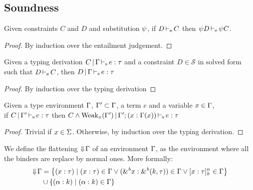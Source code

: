 \newcommand\mcase[1]{\noindent\textbf{Case }#1\\\noindent}

\subsection{Soundness}

\begin{lemma}
  \label{lemma:constrsubst}
  Given constraints $C$ and $D$ and substitution $\mathrm{\psi}$, if $D \operatorname{\vdash_e} C$
  then $\mathrm{\psi} D \operatorname{\vdash_e} \mathrm{\psi} C$.
  \begin{proof}
    By induction over the entailment judgement.
  \end{proof}
\end{lemma}

\begin{lemma}
  \label{lemma:constrimply}
  Given a typing derivation $C \operatorname{|} \Gamma \operatorname{\vdash_s} e : \tau$ and
  a constraint $D \in \mathcal S$ in solved form such that $D \operatorname{\vdash_e} C$, then
  $D \operatorname{|} \Gamma \operatorname{\vdash_s} e : \tau$
  \begin{proof}
    By induction over the typing derivation
  \end{proof}
\end{lemma}


\begin{lemma}
  \label{lemma:typ:weakening}
  Given a type environment $\Gamma$, $\Gamma' \subset \Gamma$, a term $e$ and a variable $x\in\Gamma$,\\
  if $C \operatorname{|} \Gamma' \operatorname{\vdash_s} e : \tau$
  then $C\wedge \operatorname{Weak}_{x}(\Gamma') \operatorname{|} \Gamma';(x : \Gamma(x)) \operatorname{\vdash_s} e : \tau$

  \begin{proof}
    Trivial if $x \in \Sigma$. Otherwise, by induction over the typing derivation.
  \end{proof}
\end{lemma}


We define the flattening $\Downarrow\!\Gamma$ of an environment $\Gamma$, as the environment
where all the binders are replace by normal ones. More formally:
\begin{align*}
  \Downarrow\!\Gamma
  &= \left\{ (x : \tau) \mid
    (x : \tau)\in\Gamma
    \vee ({\&}^{\textit{b}}x : {\&}^{\textit{b}}(k,\tau))\in\Gamma
    \vee [x : \tau]_{\textit{b}}^n\in\Gamma
    \right\}\\
  &\cup \left\{ (\alpha : k) \mid (\alpha : k)\in\Gamma \right\}
\end{align*}

